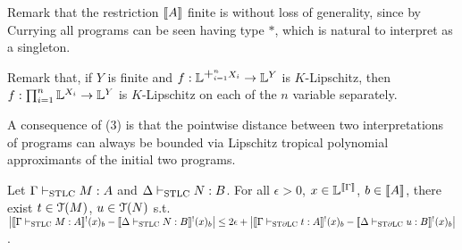 Remark that the restriction $\llbracket A\rrbracket$ finite is without loss of generality, since by Currying all programs can be seen having type $*$, which is natural to interpret as a singleton.

Remark that, if $Y$ is finite and $f:\Lawv^{\mathlarger{+}_{i=1}^n X_i}\to\Lawv^Y$ is $K$-Lipschitz, then $f:\prod_{i=1}^n \mathbb{L}^{X_i}\to \mathbb{L}^Y$ is $K$-Lipschitz on each of the $n$ variable separately.

A consequence of (3) is that the pointwise distance between two interpretations of programs can always be bounded via Lipschitz tropical polynomial approximants of the initial two programs.
\begin{corollary}
 Let $\Gamma \vdash_{\mathrm{STLC}} M:A$ and $\Delta\vdash_{\mathrm{STLC}} N:B$.
 For all $\epsilon>0$, $x\in\mathbb{L}^{\llbracket\Gamma\rrbracket}$, $b\in\llbracket A\rrbracket$, there exist $t\in\mathcal{T}(M)$, $u\in\mathcal{T}(N)$ s.t.\ $\big| \llbracket\Gamma \vdash_{\mathrm{STLC}} M:A\rrbracket^!(x)_b - \llbracket\Delta \vdash_{\mathrm{STLC}} N:B\rrbracket^!(x)_b \big| \leq 2\epsilon + \big| \llbracket\Gamma \vdash_{\mathrm{ST}\partial\mathrm{LC}} t:A\rrbracket^!(x)_b - \llbracket\Delta \vdash_{\mathrm{ST}\partial\mathrm{LC}} u:B\rrbracket^!(x)_b \big|$.
\end{corollary}
